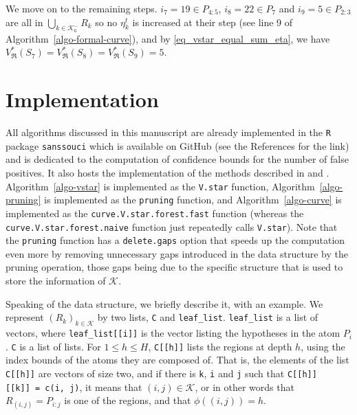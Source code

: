 \documentclass[
  11pt,
  a4paper,
]{article}
\theoremstyle{plain}
\theoremstyle{definition}
\theoremstyle{plain}
\theoremstyle{definition}
\theoremstyle{plain}
\theoremstyle{remark}
\begin{document}
We move on to the remaining steps. \(i_7=19\in P_{4:5}\),
\(i_8=22\in P_{7}\) and \(i_9=5\in P_{2:3}\) are all in
\(\bigcup_{k\in\mathcal{K}^-_6}R_k\) so no \(\eta_k^t\) is increased at
their step (see line 9 of Algorithm~\ref{algo-formal-curve}), and by
\eqref{eq_vstar_equal_sum_eta}, we have
\(V^*_{\mathfrak{R}}(S_7)=V^*_{\mathfrak{R}}(S_8)=V^*_{\mathfrak{R}}(S_9)=5\).

\section{Implementation}\label{sec-implementation}

All algorithms discussed in this manuscript are already implemented in
the \texttt{R} \citep{R-base} package \texttt{sanssouci}
\citep{sanssouci} which is available on GitHub (see the References for
the link) and is dedicated to the computation of confidence bounds for
the number of false positives. It also hosts the implementation of the
methods described in \citet{MR4124323} and
\citet{10.1093/bioinformatics/btac693}. Algorithm~\ref{algo-vstar} is
implemented as the \texttt{V.star} function,
Algorithm~\ref{algo-pruning} is implemented as the \texttt{pruning}
function, and Algorithm~\ref{algo-curve} is implemented as the
\texttt{curve.V.star.forest.fast} function (whereas the
\texttt{curve.V.star.forest.naive} function just repeatedly calls
\texttt{V.star}). Note that the \texttt{pruning} function has a
\texttt{delete.gaps} option that speeds up the computation even more by
removing unnecessary gaps introduced in the data structure by the
pruning operation, those gaps being due to the specific structure that
is used to store the information of \(\mathcal{K}\).

Speaking of the data structure, we briefly describe it, with an example.
We represent \((R_k)_{k\in\mathcal{K}}\) by two lists, \texttt{C} and
\texttt{leaf\_list}. \texttt{leaf\_list} is a list of vectors, where
\texttt{leaf\_list{[}{[}i{]}{]}} is the vector listing the hypotheses in
the atom \(P_i\). \texttt{C} is a list of lists. For \(1\leq h\leq H\),
\texttt{C{[}{[}h{]}{]}} lists the regions at depth \(h\), using the
index bounds of the atoms they are composed of. That is, the elements of
the list \texttt{C{[}{[}h{]}{]}} are vectors of size two, and if there
is \texttt{k}, \texttt{i} and \texttt{j} such that
\texttt{C{[}{[}h{]}{]}{[}{[}k{]}{]}\ =\ c(i,\ j)}, it means that
\((i, j)\in\mathcal{K}\), or in other words that \(R_{(i,j)}=P_{i:j}\)
is one of the regions, and that \(\phi((i, j))=h\).
\end{document}
